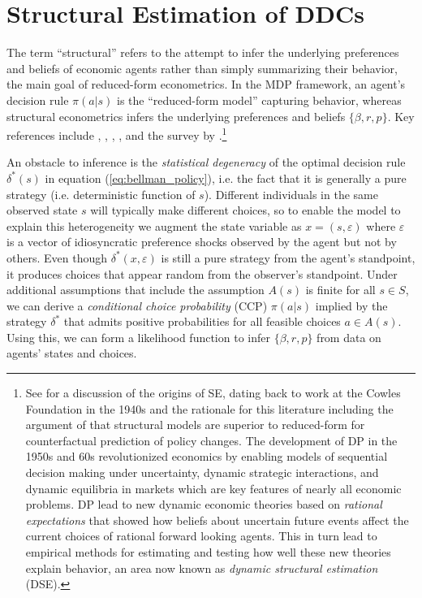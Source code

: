 \section{Structural Estimation of DDCs\label{sec:ddc}}

The term ``structural'' refers to the attempt to infer the underlying preferences and beliefs of economic
agents rather than simply summarizing their behavior, the main goal of reduced-form econometrics.
In the MDP framework, an agent's decision rule $\pi(a|s)$ is the ``reduced-form model'' capturing behavior, whereas structural econometrics infers the underlying preferences and beliefs $\{\beta,r,p\}$. Key references include \citet{rust:1987}, \citet{rust:1988}, \citet{rust:1994}, \citet{AguirregabiriaMira:2002},
and the survey by \citet{AguirregabiriaMira:2010}.\footnote{\footnotesize See \citet{rust:2014} for a discussion 
of the origins of SE, dating back to work at the Cowles Foundation in the 1940s and the rationale for this literature including
the argument of \citet{lucas:1976} that structural models are superior to reduced-form for counterfactual prediction of policy changes.
The development of DP in the 1950s and 60s 
revolutionized economics by enabling models of sequential
decision making under uncertainty, dynamic strategic interactions, and dynamic equilibria 
in markets which are key features of nearly all economic problems.  DP lead to new dynamic economic theories
based on {\it rational expectations\/} that
showed how beliefs about uncertain future events affect the current choices of rational forward looking agents. 
This in turn lead to empirical methods for estimating and testing how well these new theories
explain behavior, an area now known as {\it dynamic structural estimation\/} (DSE).} 

An obstacle to inference is the {\it statistical degeneracy\/} of the optimal decision rule $\delta^*(s)$ 
in equation (\ref{eq:bellman_policy}), i.e. the fact that it is generally a pure strategy (i.e. deterministic function of $s$). 
Different individuals in the same observed state $s$ will typically make different choices, so
to enable the  model to explain this heterogeneity we  augment the
state variable as $x=(s,\varepsilon)$  where
$\varepsilon$ is a vector of idiosyncratic preference shocks observed by the agent but not by others.
Even though $\delta^*(x,\varepsilon)$ is still a pure strategy from the agent's standpoint, it produces choices that appear
random from the observer's standpoint. Under additional assumptions that include the assumption $A(s)$ is finite for all $s \in S$,
we can derive a {\it conditional choice probability\/} (CCP) $\pi(a|s)$ implied by the 
strategy $\delta^*$ that admits positive probabilities for all feasible choices $a \in A(s)$. Using this, we can form a likelihood
function to infer $\{\beta,r,p\}$ from data on agents' states and choices.

